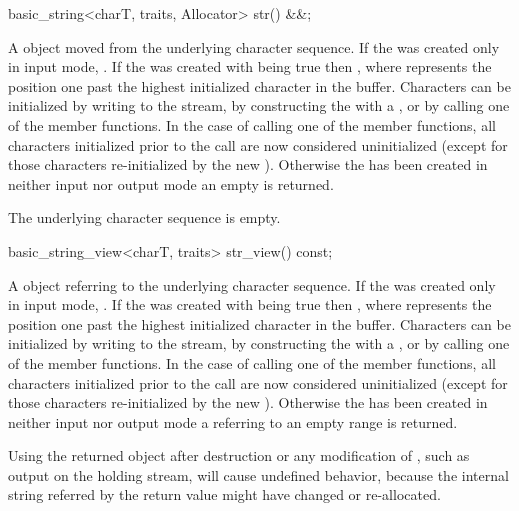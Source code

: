 \documentclass[ebook,11pt,article]{memoir}
\begin{document}
\begin{itemdecl}
basic_string<charT, traits, Allocator> str() &&;
\end{itemdecl}
\begin{itemdescr}
\pnum
\returns A  object moved from the  underlying character sequence. If the  was created only in input mode, . If the  was created with  being true then , where  represents the position one past the highest initialized character in the buffer. Characters can be initialized by writing to the stream, by constructing the  with a , or by calling one of the  member functions. In the case of calling one of the  member functions, all characters initialized prior to the call are now considered uninitialized (except for those characters re-initialized by the new ). Otherwise the  has been created in neither input nor output mode an empty  is returned. 

\pnum
\postcondition The underlying character sequence is empty.
\end{itemdescr}

\begin{itemdecl}
basic_string_view<charT, traits> str_view() const;
\end{itemdecl}
\begin{itemdescr}
\pnum
\returns A  object referring to the  underlying character sequence. If the  was created only in input mode,  . If the  was created with  being true then , where  represents the position one past the highest initialized character in the buffer. Characters can be initialized by writing to the stream, by constructing the  with a , or by calling one of the  member functions. In the case of calling one of the  member functions, all characters initialized prior to the call are now considered uninitialized (except for those characters re-initialized by the new ). Otherwise the  has been created in neither input nor output mode a  referring to an empty range is returned. 

\pnum
\enternote
Using the returned object after destruction or any modification of , such as output on the holding stream, will cause undefined behavior, because the internal string referred by the return value might have changed or re-allocated. 
\exitnote
\end{itemdescr}
\end{document}
